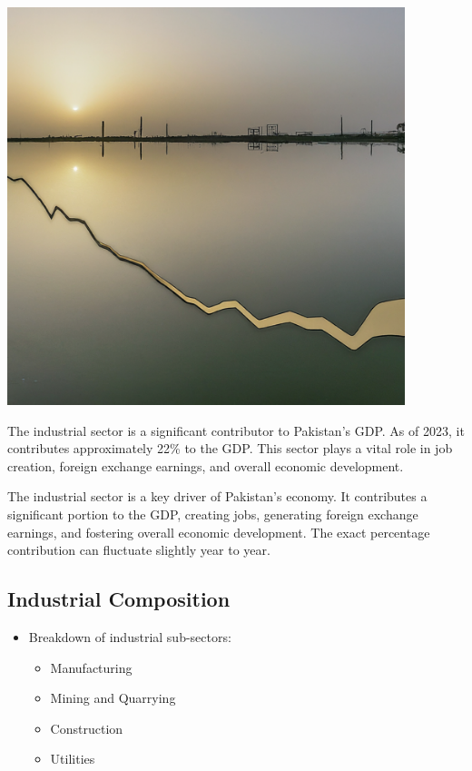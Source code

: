 \documentclass[
  letterpaper,
  DIV=11,
  numbers=noendperiod]{scrartcl}
\providecommand{\tightlist}{%
  \setlength{\itemsep}{0pt}\setlength{\parskip}{0pt}}\usepackage{longtable,booktabs,array}
\begin{document}
\includegraphics[width=4.5625in,height=\textheight]{images/industrial1.jpeg}

The industrial sector is a significant contributor to Pakistan's GDP. As
of 2023, it contributes approximately 22\% to the GDP. This sector plays
a vital role in job creation, foreign exchange earnings, and overall
economic development.

The industrial sector is a key driver of Pakistan's economy. It
contributes a significant portion to the GDP, creating jobs, generating
foreign exchange earnings, and fostering overall economic development.
The exact percentage contribution can fluctuate slightly year to year.

\subsection{Industrial Composition}\label{industrial-composition}

\begin{itemize}
\tightlist
\item
  Breakdown of industrial sub-sectors:

  \begin{itemize}
  \tightlist
  \item
    Manufacturing
  \item
    Mining and Quarrying
  \item
    Construction
  \item
    Utilities
  \end{itemize}
\end{itemize}
\end{document}
